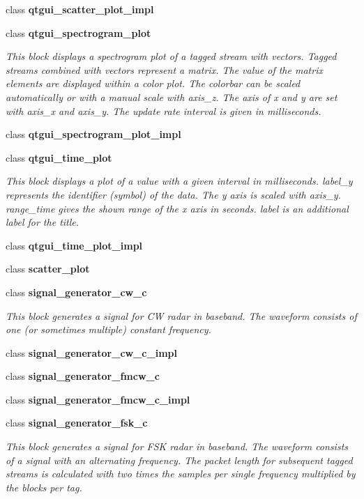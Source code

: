 \begin{DoxyCompactItemize}
class {\bf qtgui\+\_\+scatter\+\_\+plot\+\_\+impl}
\item 
class {\bf qtgui\+\_\+spectrogram\+\_\+plot}
\begin{DoxyCompactList}\small\item\em This block displays a spectrogram plot of a tagged stream with vectors. Tagged streams combined with vectors represent a matrix. The value of the matrix elements are displayed within a color plot. The colorbar can be scaled automatically or with a manual scale with axis\+\_\+z. The axis of x and y are set with axis\+\_\+x and axis\+\_\+y. The update rate interval is given in milliseconds. \end{DoxyCompactList}\item 
class {\bf qtgui\+\_\+spectrogram\+\_\+plot\+\_\+impl}
\item 
class {\bf qtgui\+\_\+time\+\_\+plot}
\begin{DoxyCompactList}\small\item\em This block displays a plot of a value with a given interval in milliseconds. label\+\_\+y represents the identifier (symbol) of the data. The y axis is scaled with axis\+\_\+y. range\+\_\+time gives the shown range of the x axis in seconds. label is an additional label for the title. \end{DoxyCompactList}\item 
class {\bf qtgui\+\_\+time\+\_\+plot\+\_\+impl}
\item 
class {\bf scatter\+\_\+plot}
\item 
class {\bf signal\+\_\+generator\+\_\+cw\+\_\+c}
\begin{DoxyCompactList}\small\item\em This block generates a signal for CW radar in baseband. The waveform consists of one (or sometimes multiple) constant frequency. \end{DoxyCompactList}\item 
class {\bf signal\+\_\+generator\+\_\+cw\+\_\+c\+\_\+impl}
\item 
class {\bf signal\+\_\+generator\+\_\+fmcw\+\_\+c}
\item 
class {\bf signal\+\_\+generator\+\_\+fmcw\+\_\+c\+\_\+impl}
\item 
class {\bf signal\+\_\+generator\+\_\+fsk\+\_\+c}
\begin{DoxyCompactList}\small\item\em This block generates a signal for F\+SK radar in baseband. The waveform consists of a signal with an alternating frequency. The packet length for subsequent tagged streams is calculated with two times the samples per single frequency multiplied by the blocks per tag. \end{DoxyCompactList}\item 

\end{DoxyCompactItemize}
